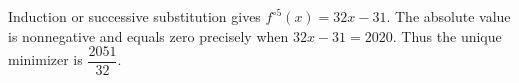 Induction or successive substitution gives $f^{\circ5}(x)=32x-31$. The absolute value is nonnegative and equals zero precisely when $32x-31=2020$. Thus the unique minimizer is $\boxed{\dfrac{2051}{32}}$.
